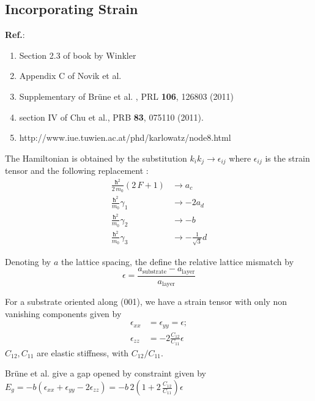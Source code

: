 \documentclass[prb,aps]{revtex4}
\begin{document}
	\subsection{Incorporating Strain}

		{\bf Ref.}:
		\begin{enumerate}
			\item Section 2.3 of book by Winkler
			\item Appendix C of Novik et al.
			\item Supplementary of Brüne et al. , PRL {\bf 106}, 126803 (2011)
			\item section IV of Chu et al., PRB {\bf 83}, 075110 (2011).
			\item http://www.iue.tuwien.ac.at/phd/karlowatz/node8.html
		\end{enumerate}

		The Hamiltonian is obtained by the substitution $k_i k_j  \to ϵ_{ij} $ where $ϵ_{ij}$ is the strain tensor and the following replacement :
		\begin{align}
			\frac{ħ^2}{2\,m_0} (2\,F+1) &\to a_c\\
			\frac{ħ^2}{ m_0} γ_1&\to - 2 a_d\\
			\frac{ħ^2}{ m_0} γ_2 &\to -  b\\
			\frac{ħ^2}{ m_0} γ_3&\to - \frac{1}{\sqrt{3}} d
		\end{align}

		Denoting by $a$ the lattice spacing, the define the relative lattice mismatch by
		\begin{equation}
		ϵ = \frac{ a_{\textrm{substrate}} - a_{\textrm{layer}} } {a_{\textrm{layer}}}
		\end{equation}

        For a substrate oriented along (001), we have a strain tensor with only non vanishing components given by
		\begin{align}
			ϵ_{xx} &= ϵ_{yy} = ϵ  ;\\
			ϵ_{zz} &= -2 \frac{C_{12}}{C_{11}} ϵ
		\end{align}
		$C_{12},C_{11}$ are elastic stiffness, with $C_{12}/C_{11}$.

		Brüne et al. give a gap opened by constraint given by
		$E_g = -b (ϵ_{xx} + ϵ_{yy} - 2 ϵ_{zz} )  = -b\,2\left(1 + 2\,\frac{C_{12}}{C_{11}}\right) ϵ$
\end{document}
